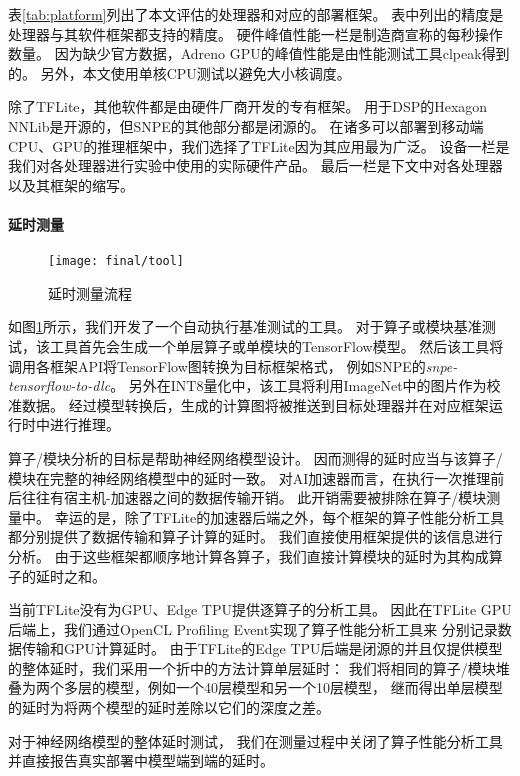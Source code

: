 
表\ref{tab:platform}列出了本文评估的处理器和对应的部署框架。
表中列出的精度是处理器与其软件框架都支持的精度。
硬件峰值性能一栏是制造商宣称的每秒操作数量。
因为缺少官方数据，Adreno GPU的峰值性能是由性能测试工具clpeak\cite{clpeak}得到的。
另外，本文使用单核CPU测试以避免大小核调度。

除了TFLite，其他软件都是由硬件厂商开发的专有框架。
用于DSP的Hexagon NNLib是开源的，但SNPE的其他部分都是闭源的。
在诸多可以部署到移动端CPU、GPU的推理框架中，我们选择了TFLite因为其应用最为广泛\cite{xu2019first}。
设备一栏是我们对各处理器进行实验中使用的实际硬件产品。
最后一栏是下文中对各处理器以及其框架的缩写。

\paragraph{延时测量}

\begin{figure}[htbp]
    \centering
    \texttt{[image: final/tool]}
    \caption{\label{fig:tool}延时测量流程}
\end{figure}

如图\ref{fig:tool}所示，我们开发了一个自动执行基准测试的工具。
对于算子或模块基准测试，该工具首先会生成一个单层算子或单模块的TensorFlow模型。
然后该工具将调用各框架API将TensorFlow图转换为目标框架格式，
例如SNPE的\emph{snpe-tensorflow-to-dlc}。
另外在INT8量化中，该工具将利用ImageNet中的图片作为校准数据。
经过模型转换后，生成的计算图将被推送到目标处理器并在对应框架运行时中进行推理。

算子/模块分析的目标是帮助神经网络模型设计。
因而测得的延时应当与该算子/模块在完整的神经网络模型中的延时一致。
对AI加速器而言，在执行一次推理前后往往有宿主机-加速器之间的数据传输开销。
此开销需要被排除在算子/模块测量中。
幸运的是，除了TFLite的加速器后端之外，每个框架的算子性能分析工具都分别提供了数据传输和算子计算的延时。
我们直接使用框架提供的该信息进行分析。
由于这些框架都顺序地计算各算子，我们直接计算模块的延时为其构成算子的延时之和。

当前TFLite没有为GPU、Edge TPU提供逐算子的分析工具。
因此在TFLite GPU后端上，我们通过OpenCL Profiling Event实现了算子性能分析工具来
分别记录数据传输和GPU计算延时。
由于TFLite的Edge TPU后端是闭源的并且仅提供模型的整体延时，我们采用一个折中的方法计算单层延时：
我们将相同的算子/模块堆叠为两个多层的模型，例如一个40层模型和另一个10层模型，
继而得出单层模型的延时为将两个模型的延时差除以它们的深度之差。

对于神经网络模型的整体延时测试，
我们在测量过程中关闭了算子性能分析工具并直接报告真实部署中模型端到端的延时。

